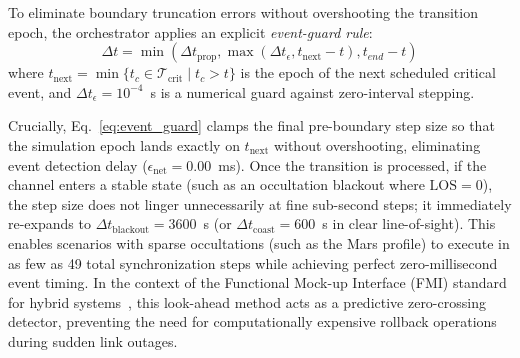 \documentclass[a4paper,fleqn]{cas-sc}
\begin{document}
To eliminate boundary truncation errors without overshooting the transition epoch, the orchestrator applies an explicit \textit{event-guard rule}:
\begin{equation}
    \Delta t = \min \left( \Delta t_{\text{prop}}, \max\left(\Delta t_{\epsilon}, t_{\text{next}} - t\right), t_{end} - t \right)
    \label{eq:event_guard}
\end{equation}
where $t_{\text{next}} = \min \{ t_c \in \mathcal{T}_{\text{crit}} \mid t_c > t \}$ is the epoch of the next scheduled critical event, and $\Delta t_{\epsilon} = 10^{-4}$~s is a numerical guard against zero-interval stepping. 

Crucially, Eq.~\eqref{eq:event_guard} clamps the final pre-boundary step size so that the simulation epoch lands exactly on $t_{\text{next}}$ without overshooting, eliminating event detection delay ($\epsilon_{\text{net}} = 0.00$~ms). Once the transition is processed, if the channel enters a stable state (such as an occultation blackout where $\text{LOS} = 0$), the step size does not linger unnecessarily at fine sub-second steps; it immediately re-expands to $\Delta t_{\text{blackout}} = 3600$~s (or $\Delta t_{\text{coast}} = 600$~s in clear line-of-sight). This enables scenarios with sparse occultations (such as the Mars profile) to execute in as few as 49 total synchronization steps while achieving perfect zero-millisecond event timing. In the context of the Functional Mock-up Interface (FMI) standard for hybrid systems~\cite{fmi_standard, simpat_adaptive}, this look-ahead method acts as a predictive zero-crossing detector, preventing the need for computationally expensive rollback operations during sudden link outages.
\end{document}
